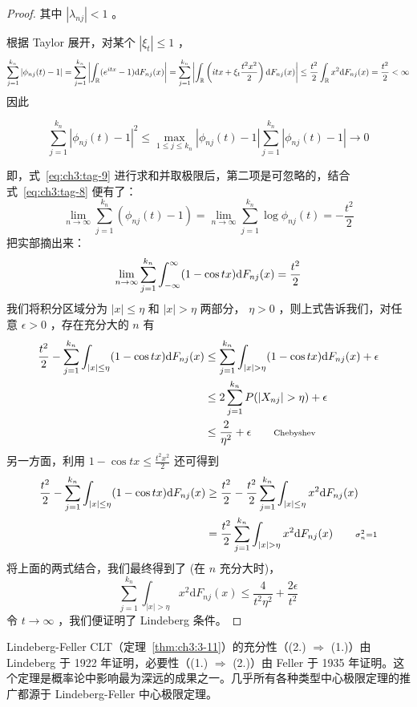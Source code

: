 \begin{proof}
其中 $|\lambda_{nj}| < 1$ 。

根据 Taylor 展开，对某个 $|\xi_t|\le 1$ ，
\[\sum_{j = 1}^{k_n}|\phi_{nj}(t) - 1| = \sum_{j = 1}^{k_n}\left|\int_{\mathbb R} (e^{itx} - 1){\rm d}F_{nj}(x)\right| =\sum_{j = 1}^{k_n}\left|\int_{\mathbb R} \left(itx + \xi_t\frac{t^2x^2}{2}\right){\rm d}F_{nj}(x)\right|\leq \frac{t^2}{2}\int_{\mathbb R}x^2\mathrm{d}F_{nj}(x)= \frac{t^2}{2} < \infty\]
因此

\begin{equation}
\label{eq:ch3:tag-8}
\sum_{j = 1}^{k_n}|\phi_{nj}(t) - 1|^2\leq \max_{1\leq j\leq k_n}|\phi_{nj}(t) - 1|\sum_{j = 1}^{k_n}|\phi_{nj}(t) - 1| \to 0
\end{equation}

即，式~\eqref{eq:ch3:tag-9} 进行求和并取极限后，第二项是可忽略的，结合式~\eqref{eq:ch3:tag-8} 便有了：
\[\lim_{n\to \infty} \sum_{j=1}^{k_n} (\phi_{nj}(t) - 1) = \lim_{n\to \infty} \sum_{j=1}^{k_n} \log \phi_{nj}(t) = -\frac{t^2}{2}\]
把实部摘出来：
\[\lim_{n\to \infty} \sum_{j=1}^{k_n} \int_{-\infty}^{\infty} (1 - \cos tx) {\rm d}F_{nj}(x) = \frac{t^2}{2}\]
我们将积分区域分为 $|x|\le \eta$ 和 $|x|>\eta$ 两部分， $\eta>0$ ，则上式告诉我们，对任意 $\epsilon>0$ ，存在充分大的 $n$ 有
\[\begin{aligned} \frac{t^2}{2} - \sum_{j=1}^{k_n}\int_{|x|\le\eta}(1-\cos tx){\rm d}F_{nj}(x) &\le \sum_{j=1}^{k_n}\int_{|x|>\eta}(1-\cos tx){\rm d}F_{nj}(x) + \epsilon\\ &\le 2\sum_{j=1}^{k_n} P(|X_{nj}|>\eta) + \epsilon\\ &\le \frac{2}{\eta^2} + \epsilon\qquad \text{\scriptsize Chebyshev} \end{aligned}\]
另一方面，利用 $1-\cos tx \le \frac{t^2 x^2}{2}$ 还可得到
\[\begin{aligned} \frac{t^2}{2} - \sum_{j=1}^{k_n}\int_{|x|\le\eta}(1-\cos tx){\rm d}F_{nj}(x) &\ge  \frac{t^2}{2} -  \frac{t^2}{2}\sum_{j=1}^{k_n}\int_{|x|\le \eta}x^2{\rm d}F_{nj}(x) \\ &=\frac {t^2}2\sum_{j=1}^{k_n}\int_{|x|>\eta}x^2{\rm d}F_{nj}(x) \qquad {\scriptstyle \sigma_n^2=1}\\  \end{aligned}\]
将上面的两式结合，我们最终得到了 (在 $n$ 充分大时)，
\[\sum_{j=1}^{k_n}\int_{|x|>\eta}x^2\mathrm{d}F_{nj}(x)\leq \frac{4}{t^2 \eta^2} + \frac{2 \epsilon}{t^2}\]
令 $t \to \infty$ ，我们便证明了 Lindeberg 条件。

\end{proof}

Lindeberg-Feller CLT（定理~\ref{thm:ch3:3-11}）的充分性（(2.) $\Rightarrow$ (1.)）由 Lindeberg 于 1922 年证明，必要性（(1.) $\Rightarrow$ (2.)）由 Feller 于 1935 年证明。这个定理是概率论中影响最为深远的成果之一。几乎所有各种类型中心极限定理的推广都源于 Lindeberg-Feller 中心极限定理。


